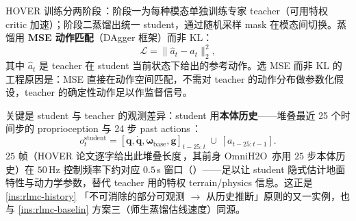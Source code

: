 HOVER 训练分两阶段\,\cite{he2025hover}：阶段一为每种模态单独训练专家 teacher（可用特权 critic 加速）；阶段二蒸馏出统一 student，通过随机采样 mask 在模态间切换。蒸馏用 \textbf{MSE 动作匹配}（DAgger 框架）而非 KL：
\begin{equation}
\mathcal L = \lVert\hat a_t - a_t\rVert_2^2,
\label{eq:rlmc-hover-dagger}
\end{equation}
其中 $\hat a_t$ 是 teacher 在 student 当前状态下给出的参考动作。选 MSE 而非 KL 的工程原因是：MSE 直接在动作空间匹配，不需对 teacher 的动作分布做参数化假设，teacher 的确定性动作足以作监督信号。

关键是 student 与 teacher 的观测差异：student 用\textbf{本体历史}——堆叠最近 25 个时间步的 proprioception 与 24 步 past actions\,\cite{he2025hover}：
\begin{equation*}
o^{\text{student}}_t = [\mathbf q,\dot{\mathbf q},\boldsymbol\omega_{\text{base}},\mathbf g]_{t-25:t}\ \cup\ [a_{t-25:t-1}].
\end{equation*}
$25$ 帧（HOVER 论文逐字给出此堆叠长度\,\cite{he2025hover}，其前身 OmniH2O\,\cite{he2024omnih2o} 亦用 $25$ 步本体历史）在 $50\,$Hz 控制频率下约对应 $0.5\,$s 窗口（）——足以让 student 隐式估计地面特性与动力学参数，替代 teacher 用的特权 terrain/physics 信息。这正是 \cref{ins:rlmc-history} 「不可消除的部分可观测 $\to$ 从历史推断」原则的又一实例，也与 \cref{ins:rlmc-baselin} 方案三（师生蒸馏估线速度）同源。



